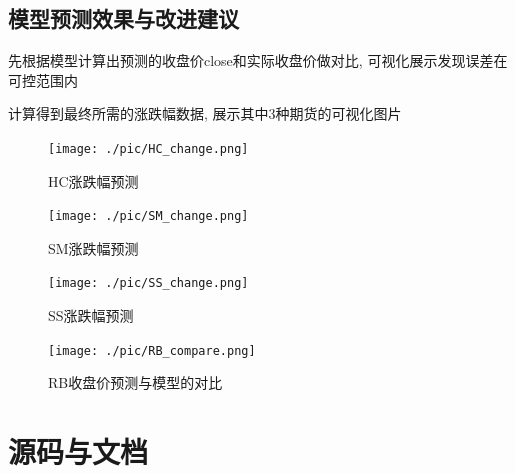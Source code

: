 \documentclass[a4paper,11pt]{ctexart}
\begin{document}
\subsection{模型预测效果与改进建议}
先根据模型计算出预测的收盘价close和实际收盘价做对比, 可视化展示发现误差在可控范围内

计算得到最终所需的涨跌幅数据, 展示其中3种期货的可视化图片
\FloatBarrier
\noindent
\begin{figure}[H]
  \centering
  \texttt{[image: ./pic/HC\_change.png]}
  \caption*{HC涨跌幅预测}
\end{figure}
\begin{figure}[H]
  \centering
  \texttt{[image: ./pic/SM\_change.png]}
  \caption*{SM涨跌幅预测}
\end{figure}
\begin{figure}[H]
  \centering
  \texttt{[image: ./pic/SS\_change.png]}
  \caption*{SS涨跌幅预测}
\end{figure}
\begin{figure}[H]
  \centering
  \texttt{[image: ./pic/RB\_compare.png]}
  \caption*{RB收盘价预测与模型的对比}
\end{figure}
\section{源码与文档}
\end{document}
